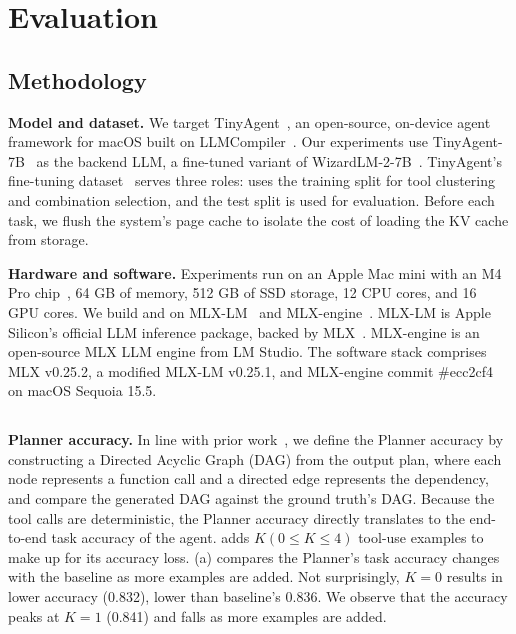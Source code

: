 \section{Evaluation} \label{sect:eval}

\subsection{Methodology} \label{sect:methodology}
{\bf Model and dataset.} We target TinyAgent~\cite{tinyagent}, an open-source, on-device agent framework for macOS built on LLMCompiler~\cite{llmcompiler}. Our experiments use TinyAgent-7B~\cite{tinyagent_7b} as the backend LLM, a fine-tuned variant of WizardLM-2-7B~\cite{wizardlm2}. TinyAgent’s fine-tuning dataset~\cite{tinyagent_dataset} serves three roles: \prefill uses the training split for tool clustering and combination selection, and the test split is used for evaluation. Before each task, we flush the system’s page cache to isolate the cost of loading the KV cache from storage.


{\bf Hardware and software.} Experiments run on an Apple Mac mini with an M4 Pro chip~\cite{apple_m4_pro_max}, 64 GB of memory, 512 GB of SSD storage, 12 CPU cores, and 16 GPU cores. We build \prefill and \decode on MLX-LM~\cite{mlx_lm} and MLX-engine~\cite{mlx_engine}. MLX-LM is Apple Silicon’s official LLM inference package, backed by MLX~\cite{mlx}. MLX-engine is an open-source MLX LLM engine from LM Studio. The software stack comprises MLX v0.25.2, a modified MLX-LM v0.25.1, and MLX-engine commit \#ecc2cf4 on macOS Sequoia 15.5.


\subsection{\prefill} \label{sect:eval_prefill}

{\bf Planner accuracy.}
In line with prior work~\cite{llmcompiler,tinyagent}, we define the Planner accuracy by constructing a Directed Acyclic Graph (DAG) from the output plan, where each node represents a function call and a directed edge represents the dependency, and compare the generated DAG against the ground truth's DAG. Because the tool calls are deterministic, the Planner accuracy directly translates to the end-to-end task accuracy of the agent. \prefill adds $K (0 \le K \le 4)$ tool-use examples to make up for its accuracy loss. (a) compares the Planner's task accuracy changes with the baseline as more examples are added. Not surprisingly, $K=0$ results in lower accuracy (0.832), lower than baseline's 0.836. We observe that the accuracy peaks at $K=1$ (0.841) and falls as more examples are added.

